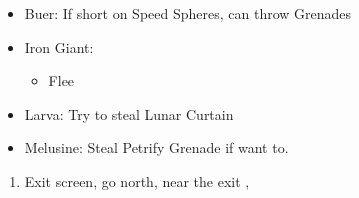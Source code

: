 \begin{encounters}
  \begin{itemize}
    \item Buer: If short on Speed Spheres, can throw Grenades
    \item Iron Giant:
          \begin{itemize}
            \switch{\tidus}{\rikku}
            \rikkuf Steal Light Curtain
            \switch{\wakka}{\tidus}
            \tidusf Defend
            \enemyf Attacks \rikku
            \auronf Defend
            \item Flee 
          \end{itemize}
    \item Larva: Try to steal Lunar Curtain
    \item Melusine: Steal Petrify Grenade if want to.
  \end{itemize}
\end{encounters}
\begin{enumerate}[resume]
  \item Exit screen, go north, near the exit \sd, \cs[3:10]
\end{enumerate}